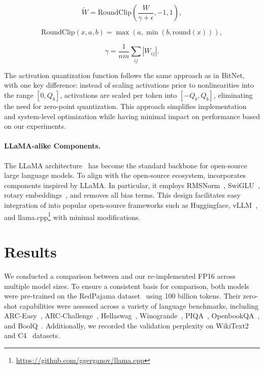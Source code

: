 \begin{equation}
    \widetilde{W} = \mathrm{RoundClip}\left(\frac{W}{\gamma + \epsilon}, -1, 1\right),
\end{equation}

\begin{equation}
    \mathrm{RoundClip}(x, a, b) = \max\left(a, \min\left(b, \mathrm{round}(x)\right)\right),
\end{equation}

\begin{equation}
    \gamma = \frac{1}{nm}\sum_{ij} |W_{ij}|.
\end{equation}

The activation quantization function follows the same approach as in BitNet, with one key difference: instead of scaling activations prior to nonlinearities into the range $[0, Q_b]$, activations are scaled per token into $[-Q_b, Q_b]$, eliminating the need for zero-point quantization. This approach simplifies implementation and system-level optimization while having minimal impact on performance based on our experiments.

\paragraph{LLaMA-alike Components.}

The LLaMA architecture~\cite{llama, llama2} has become the standard backbone for open-source large language models. To align with the open-source ecosystem,  incorporates components inspired by LLaMA. In particular, it employs RMSNorm~\cite{rmsnorm}, SwiGLU~\cite{swiglu}, rotary embeddings~\cite{rope}, and removes all bias terms. This design facilitates easy integration of  into popular open-source frameworks such as Huggingface, vLLM~\cite{vllm}, and llama.cpp\footnote{\url{https://github.com/ggerganov/llama.cpp}} with minimal modifications.

\section{Results}

We conducted a comparison between  and our re-implemented FP16  across multiple model sizes. To ensure a consistent basis for comparison, both models were pre-trained on the RedPajama dataset~\cite{redpajama} using 100 billion tokens. Their zero-shot capabilities were assessed across a variety of language benchmarks, including ARC-Easy~\cite{arc}, ARC-Challenge~\cite{arc}, Hellaswag~\cite{hellaswag}, Winogrande~\cite{winoGrande}, PIQA~\cite{piqa}, OpenbookQA~\cite{openbookqa}, and BoolQ~\cite{boolq}. Additionally, we recorded the validation perplexity on WikiText2~\cite{wikitext2} and C4~\cite{c4} datasets.

